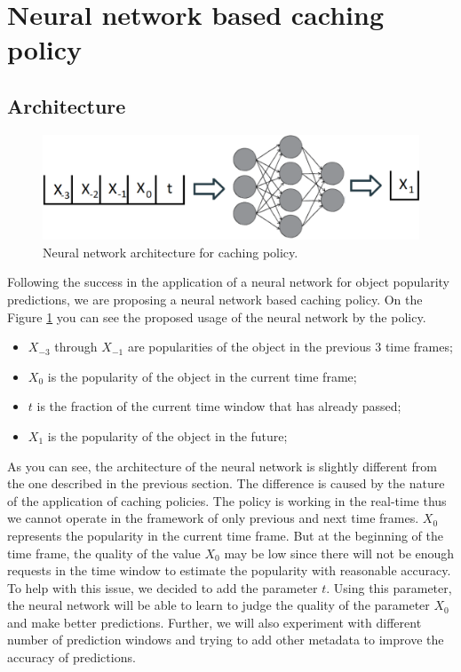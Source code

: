\section{Neural network based caching policy} \label{caching_policy}

\subsection{Architecture} \label{architecture}

\begin{figure}[b!]
	\centering
	\includegraphics[width=\linewidth]{pics/cache1.png}
	\caption{Neural network architecture for caching policy.}
	\label{fig:cache1}
\end{figure}

Following the success in the application of a neural network for object popularity predictions, we are proposing a neural network based caching policy. On the Figure \ref{fig:cache1} you can see the proposed usage of the neural network by the policy.

\begin{itemize}
	\item $X_{-3}$ through $X_{-1}$ are popularities of the object in the previous 3 time frames;
	\item $X_0$ is the popularity of the object in the current time frame;
	\item $t$ is the fraction of the current time window that has already passed;
	\item $X_1$ is the popularity of the object in the future;
\end{itemize}

As you can see, the architecture of the neural network is slightly different from the one described in the previous section.  The difference is caused by the nature of the application of caching policies. The policy is working in the real-time thus we cannot operate in the framework of only previous and next time frames. $X_0$ represents the popularity in the current time frame. But at the beginning of the time frame, the quality of the value $X_0$ may be low since there will not be enough requests in the time window to estimate the popularity with reasonable accuracy. To help with this issue, we decided to add the parameter $t$. Using this parameter, the neural network will be able to learn to judge the quality of the parameter $X_0$ and make better predictions. Further, we will also experiment with different number of prediction windows and trying to add other metadata to improve the accuracy of predictions.

